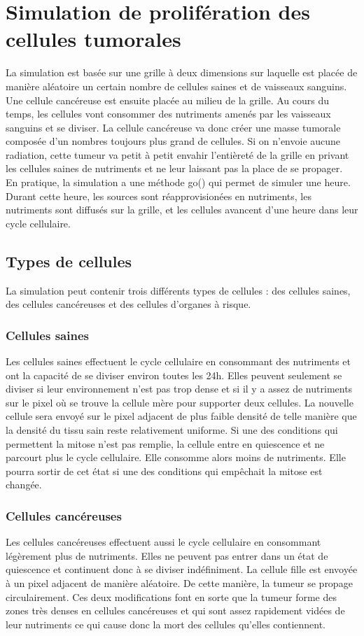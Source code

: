 \documentclass[12pt]{article}
\begin{document}
\section{Simulation de prolifération des cellules tumorales}
La simulation est basée sur une grille à deux dimensions sur laquelle est placée de manière aléatoire un certain nombre de cellules saines et de vaisseaux sanguins. Une cellule cancéreuse est ensuite placée au milieu de la grille. Au cours du temps, les cellules vont consommer des nutriments amenés par les vaisseaux sanguins et se diviser. La cellule cancéreuse va donc créer une masse tumorale composée d'un nombres toujours plus grand de cellules. Si on n'envoie aucune radiation, cette tumeur va petit à petit envahir l'entièreté de la grille en privant les cellules saines de nutriments et ne leur laissant pas la place de se propager.\\

En pratique, la simulation a une méthode go() qui permet de simuler une heure. Durant cette heure, les sources sont réapprovisionées en nutriments, les nutriments sont diffusés sur la grille, et les cellules avancent d'une heure dans leur cycle cellulaire.

\subsection{Types de cellules}
La simulation peut contenir trois différents types de cellules : des cellules saines, des cellules cancéreuses et des cellules d'organes à risque.
\subsubsection{Cellules saines}
Les cellules saines effectuent le cycle cellulaire en consommant des nutriments et ont la capacité de se diviser environ toutes les 24h. Elles peuvent seulement se diviser si leur environnement n'est pas trop dense et si il y a assez de nutriments sur le pixel où se trouve la cellule mère pour supporter deux cellules. La nouvelle cellule sera envoyé sur le pixel adjacent de plus faible densité de telle manière que la densité du tissu sain reste relativement uniforme. Si une des conditions qui permettent la mitose n'est pas remplie, la cellule entre en quiescence et ne parcourt plus le cycle cellulaire. Elle consomme alors moins de nutriments. Elle pourra sortir de cet état si une des conditions qui empêchait la mitose est changée.
\subsubsection{Cellules cancéreuses}
Les cellules cancéreuses effectuent aussi le cycle cellulaire en consommant légèrement plus de nutriments. Elles ne peuvent pas entrer dans un état de quiescence et continuent donc à se diviser indéfiniment. La cellule fille est envoyée à un pixel adjacent de manière aléatoire. De cette manière, la tumeur se propage circulairement. Ces deux modifications font en sorte que la tumeur forme des zones très denses en cellules cancéreuses et qui sont assez rapidement vidées de leur nutriments ce qui cause donc la mort des cellules qu'elles contiennent.
\end{document}
